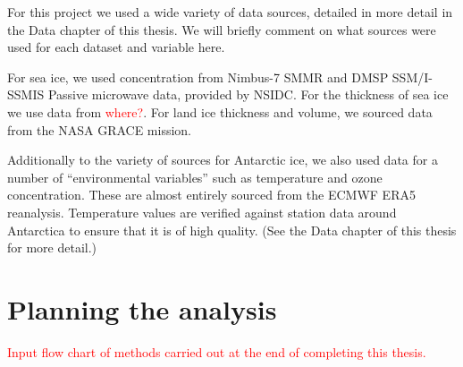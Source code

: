 \documentclass[../main.tex]{subfiles}
\begin{document}
For this project we used a wide variety of data sources, detailed in more detail in the Data chapter of this thesis. We will briefly comment on what sources were used for each dataset and variable here.

For sea ice, we used concentration from Nimbus-7 SMMR and DMSP SSM/I-SSMIS Passive microwave data, provided by NSIDC. For the thickness of sea ice we use data from \textcolor{red}{where?}. For land ice thickness and volume, we sourced data from the NASA GRACE mission. 

Additionally to the variety of sources for Antarctic ice, we also used data for a number of ``environmental variables'' such as temperature and ozone concentration. These are almost entirely sourced from the ECMWF ERA5 reanalysis. Temperature values are verified against station data around Antarctica to ensure that it is of high quality. (See the Data chapter of this thesis for more detail.)

\section{Planning the analysis}
\textcolor{red}{Input flow chart of methods carried out at the end of completing this thesis.}
\end{document}
